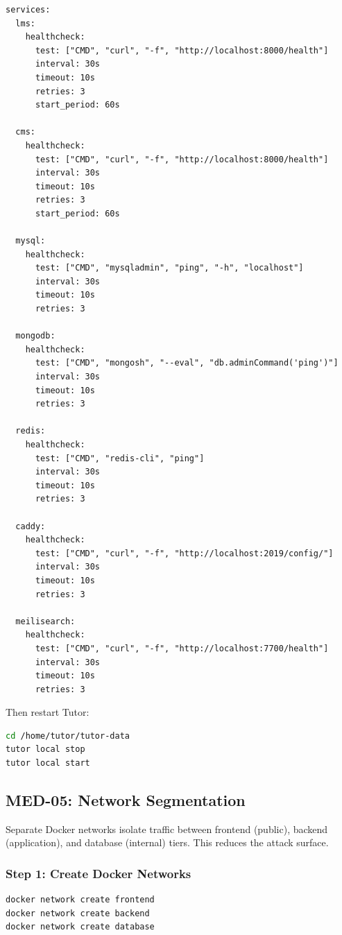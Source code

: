 \begin{lstlisting}[caption={docker-compose.override.yml for health checks}]
services:
  lms:
    healthcheck:
      test: ["CMD", "curl", "-f", "http://localhost:8000/health"]
      interval: 30s
      timeout: 10s
      retries: 3
      start_period: 60s

  cms:
    healthcheck:
      test: ["CMD", "curl", "-f", "http://localhost:8000/health"]
      interval: 30s
      timeout: 10s
      retries: 3
      start_period: 60s

  mysql:
    healthcheck:
      test: ["CMD", "mysqladmin", "ping", "-h", "localhost"]
      interval: 30s
      timeout: 10s
      retries: 3

  mongodb:
    healthcheck:
      test: ["CMD", "mongosh", "--eval", "db.adminCommand('ping')"]
      interval: 30s
      timeout: 10s
      retries: 3

  redis:
    healthcheck:
      test: ["CMD", "redis-cli", "ping"]
      interval: 30s
      timeout: 10s
      retries: 3

  caddy:
    healthcheck:
      test: ["CMD", "curl", "-f", "http://localhost:2019/config/"]
      interval: 30s
      timeout: 10s
      retries: 3

  meilisearch:
    healthcheck:
      test: ["CMD", "curl", "-f", "http://localhost:7700/health"]
      interval: 30s
      timeout: 10s
      retries: 3
\end{lstlisting}

Then restart Tutor:

\begin{lstlisting}[language=bash, caption={Apply health checks}]
cd /home/tutor/tutor-data
tutor local stop
tutor local start
\end{lstlisting}

\subsection{MED-05: Network Segmentation}

Separate Docker networks isolate traffic between frontend (public), backend (application), and database (internal) tiers. This reduces the attack surface.

\subsubsection{Step 1: Create Docker Networks}

\begin{lstlisting}[language=bash]
docker network create frontend
docker network create backend
docker network create database
\end{lstlisting}

